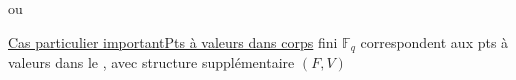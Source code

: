 ou 

\uline{Cas particulier important}\quad \uline{Pts à valeurs dans corps}
fini $\mathbb F_q$ correspondent aux pts à valeurs dans le
,
avec structure supplémentaire $(F,V)$
